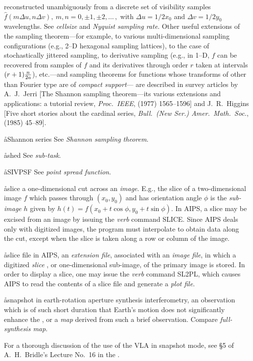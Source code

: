 reconstructed unambiguously from a discrete set of visibility samples
$\hat f(m\Delta u,n\Delta v),\ {m,n}=0,\pm1,\pm2,\ldots\,,$
with $\Delta u=1/2x_0$ and $\Delta v=1/2y_0$ wavelengths.
See {\it cellsize} and {\it Nyquist sampling rate}.
Other useful extensions of the sampling theorem---for example,
to various multi-dimensional sampling configurations (e.g., 2--D
hexagonal sampling lattices), to the case of stochastically jittered sampling,
to derivative sampling (e.g., in 1--D, $f$ can be recovered from samples of $f$
and its derivatives through order $r$ taken at intervals $(r+1){n\over2a}$),
etc.---and sampling theorems for functions whose transforms of other
than Fourier type are of {\it compact support}\/---%
are described in survey articles by A.~J.~Jerri
[The Shannon sampling theorem---its various extensions and applications:
a tutorial review, {\it Proc.~IEEE},  (1977) 1565--1596]
and J.~R.~Higgins [Five short stories about the cardinal series,
{\it Bull.\ (New Ser.) Amer.\ Math.\ Soc.},  (1985) 45--89].

\aa{Shannon series}
See {\it Shannon sampling theorem}.

\aa{shed} See {\it sub-task}.

\aa{SIVPSF} See {\it point spread function}.

\aa{slice}
a one-dimensional cut across an {\it image}.
E.g., the slice of a two-dimensional image $f$
which passes through $(x_0,y_0)$ and has orientation angle $\phi$
is the {\it sub-image} $h$ given by $h(t)=f(x_0+t\cos\phi,y_0+t\sin\phi)$.
In AIPS, a slice may be excised from an image
by issuing the {\it verb} command SLICE.
Since AIPS deals only with digitized images, the program must
interpolate to obtain data along the cut,
except when the slice is taken along a row or column of the image.

\aa{slice file}
in AIPS, an {\it extension file}, associated with an {\it image file},
in which a digitized {\it slice} \qv, or one-dimensional sub-image, of the
primary image is stored.
In order to display a slice, one may issue the {\it verb}
command SL2PL, which causes AIPS to read the contents of a slice file
and generate a {\it plot file}.

\aa{snapshot}
in earth-rotation aperture synthesis interferometry,
an observation which is of such short duration that Earth's motion
does not significantly enhance the ,
or a {\it map} derived from such a brief observation.
Compare {\it full-synthesis map}.
\par
For a thorough discussion of the use of the VLA in snapshot mode,
see \S 5 of A.~H.~Bridle's Lecture No.~16 in the \ssp.

